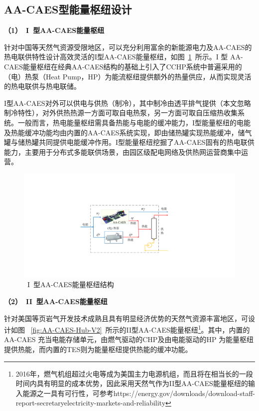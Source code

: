 \subsection{AA-CAES型能量枢纽设计}

\textbf{（1）~I~型AA-CAES能量枢纽}

针对中国等天然气资源受限地区，可以充分利用富余的新能源电力及AA-CAES的热电联供特性设计高效灵活的I型AA-CAES能量枢纽，如图~\ref{fig:AA-CAES-Hub-V1}~所示。I 型 AA-CAES能量枢纽在经典AA-CAES结构的基础上引入了CCHP系统中普遍采用的（电）热泵（Heat Pump，HP）为能流枢纽提供额外的热量供应，从而实现灵活的热电联供与热电联储。

I型AA-CAES对外可以供电与供热（制冷），其中制冷由透平排气提供（本文忽略制冷特性），对外供热热源一方面可取自电热泵，另一方面可取自压缩热收集系统。一般而言，热电能量枢纽需具备热能与电能的缓冲能力，I型能量枢纽的电能及热能缓冲功能均由内置的AA-CAES系统实现，即由储热罐实现热能缓冲，储气罐与储热罐共同提供电能缓冲作用。I型能量枢纽挖掘了AA-CAES固有的热电联供能力，主要用于分布式多能联供场景，由园区级配电网络及供热网运营商集中运营。

\begin{figure}[H] %
  \centering
  \includegraphics[scale=0.41]{figures/Chap4-2-AA-CAES-Hub-V1-3.pdf}
  \caption{~I~型AA-CAES能量枢纽结构}
  \label{fig:AA-CAES-Hub-V1}
\end{figure}

\textbf{（2）~II~型AA-CAES能量枢纽}

针对美国等页岩气开发技术成熟且具有明显经济优势的天然气资源丰富地区，可设计如图
~\ref{fig:AA-CAES-Hub-V2}~所示的II型AA-CAES能量枢纽\footnote{2016年，燃气机组超过火电等成为美国主力电源机组，而且将在相当长的一段时间内具有明显的成本优势，因此采用天然气作为II型AA-CAES能量枢纽的输入能源之一具有可行性，可参考https://energy.gov/downloads/download-staff-report-secretaryelectricity-markets-and-reliability}。其中，内置的AA-CAES 充当电能存储单元，由燃气驱动的CHP及由电能驱动的HP 为能量枢纽提供热能，而内置的TES则为能量枢纽提供热能的缓冲功能。

